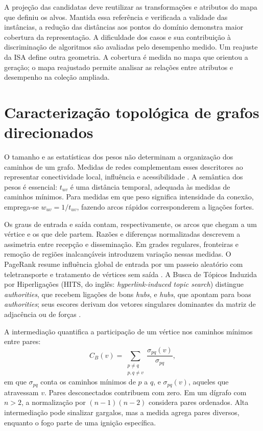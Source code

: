 A projeção das candidatas deve reutilizar as transformações e atributos
do mapa que definiu os alvos. Mantida essa referência e verificada a validade
das instâncias, a redução das distâncias aos pontos do domínio demonstra
maior cobertura da representação. A dificuldade dos casos e sua contribuição
à discriminação de algoritmos são avaliadas pelo desempenho medido.
Um reajuste da ISA define outra geometria. A cobertura é medida no mapa
que orientou a geração; o mapa reajustado permite analisar as relações
entre atributos e desempenho na coleção ampliada.

\section{Caracterização topológica de grafos direcionados}\label{sec:topologia}

O tamanho e as estatísticas dos pesos não determinam a organização dos caminhos
de um grafo. Medidas de redes complementam esses descritores ao representar
conectividade local, influência e acessibilidade \cite{Newman2018}.
A semântica dos pesos é essencial: $t_{uv}$ é uma distância temporal,
adequada às medidas de caminhos mínimos. Para medidas em que peso significa
intensidade da conexão, emprega-se $w_{uv}=1/t_{uv}$, fazendo arcos rápidos
corresponderem a ligações fortes.

Os graus de entrada e saída contam, respectivamente, os arcos que chegam
a um vértice e os que dele partem. Razões e diferenças normalizadas
descrevem a assimetria entre recepção e disseminação. Em grades regulares,
fronteiras e remoção de regiões inalcançáveis introduzem variação nessas
medidas. O PageRank resume influência global de entrada por um passeio
aleatório com teletransporte e tratamento de vértices sem saída
\cite{BrinPage1998}. A Busca de Tópicos Induzida por Hiperligações (HITS, do inglês:
\textit{hyperlink-induced topic search}) distingue \textit{authorities}, que recebem
ligações de bons \textit{hubs}, e \textit{hubs}, que apontam para boas \textit{authorities};
seus escores derivam dos vetores singulares dominantes da matriz de
adjacência ou de forças \cite{Kleinberg1999}.

A intermediação quantifica a participação de um vértice nos caminhos
mínimos entre pares:
\begin{equation}
 C_B(v)=\sum_{\substack{p\neq q\\p,q\neq v}}
 \frac{\sigma_{pq}(v)}{\sigma_{pq}},
 \label{eq:betweenness}
\end{equation}
\noindent em que $\sigma_{pq}$ conta os caminhos mínimos de $p$ a $q$,
e $\sigma_{pq}(v)$, aqueles que atravessam $v$. Pares desconectados
contribuem com zero. Em um dígrafo com $n>2$, a normalização por
$(n-1)(n-2)$ considera pares ordenados. Alta intermediação pode sinalizar
gargalos, mas a medida agrega pares diversos, enquanto o fogo parte de
uma ignição específica.

